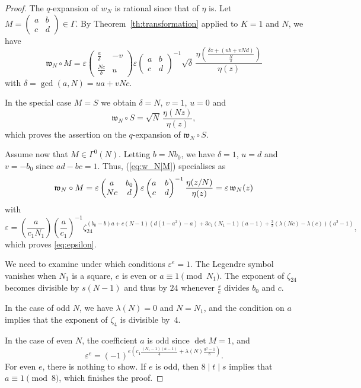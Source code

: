 \documentclass[12pt,twoside,leqno]{article}
\numberwithin{equation}{section}
\newcommand{\legendre}[2]{\genfrac {(}{)}{1pt}{}{#1}{#2}}
\newcommand{\w}{\mathfrak w}
\begin{document}
\begin {proof}
The $q$-expansion of $w_N$ is rational since that of $\eta$ is.
Let $M = \begin {pmatrix} a & b \\ c & d \end {pmatrix} \in \Gamma$.
By Theorem~\ref {th:transformation} applied to $K = 1$ and $N$, we have
\begin {equation}
\label {eq:w_N|M}
\w_N \circ M = \varepsilon \begin {pmatrix} \frac {a}{\delta} & -v \\ \frac
{Nc}{\delta} & u \end {pmatrix}
\varepsilon \begin {pmatrix} a & b \\ c & d \end {pmatrix}^{-1}
\sqrt \delta \,
\frac {\eta \left( \frac {\delta z + (ub + vNd)}{\frac {N}{\delta}}
\right)}
{\eta (z)}
\end {equation}
with $\delta = \gcd (a, N) = u a + v N c$.

In the special case $M = S$ we obtain $\delta = N$, $v = 1$, $u = 0$ and
\[
\w_N \circ S = \sqrt N \, \frac {\eta (N z)}{\eta (z)},
\]
which proves the assertion on the $q$-expansion of $\w_N \circ S$.

Assume now that $M \in \Gamma^0 (N)$. Letting $b = N b_0$, we have
$\delta = 1$, $u = d$ and $v = - b_0$ since $a d - b c = 1$.
Thus, (\ref {eq:w_N|M}) specialises as
\[
\w_N \circ M
= \varepsilon \begin {pmatrix} a & b_0 \\ Nc & d \end {pmatrix}
\varepsilon \begin {pmatrix} a & b \\ c & d \end {pmatrix}^{-1}
\frac {\eta (z / N)}{\eta (z)} \\
= \varepsilon \, \w_N (z)
\]
with
\[
\varepsilon = \legendre {a}{c_1 N_1} \legendre {a}{c_1}^{-1}
\zeta_{24}^{(b_0 - b) a + c (N - 1) (d (1 - a^2) - a) + 3 c_1 (N_1 - 1) (a
- 1) + \frac {3}{2} (\lambda (N c) - \lambda (c)) (a^2 - 1)},
\]
which proves \eqref {eq:epsilon}.

We need to examine under which conditions $\varepsilon^e = 1$.
The Legendre symbol vanishes when $N_1$ is a square, $e$ is even
or $a \equiv 1 \pmod {N_1}$. The exponent of $\zeta_{24}$ becomes
divisible by $s (N - 1)$ and thus by $24$ whenever $\frac {s}{e}$
divides $b_0$ and $c$.

In the case of odd $N$, we have $\lambda (N) = 0$ and $N = N_1$, and
the condition on $a$ implies that the exponent of $\zeta_4$ is
divisible by~$4$.

In the case of even $N$, the coefficient $a$ is odd since $\det M = 1$,
and
$$
\varepsilon^e = (-1)^{e \left( c_1 \frac {(N_1 - 1)(a - 1)}{4}
+ \lambda (N) \frac {a^2 - 1}{8} \right)}.
$$
For even $e$, there is nothing to show. If $e$ is odd, then $8 \mid t \mid s$
implies that $a \equiv 1 \pmod 8$, which finishes the proof.
\end {proof}
\end{document}
